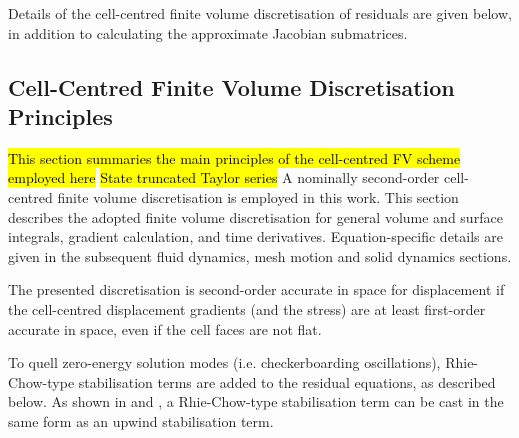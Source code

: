 \documentclass[sn-mathphys,Numbered]{sn-jnl}%
\newcommand{\bb}{\boldsymbol}
\begin{document}
Details of the cell-centred finite volume discretisation of residuals are given below, in addition to calculating the approximate Jacobian submatrices.




\subsection{Cell-Centred Finite Volume Discretisation Principles}
\hl{This section summaries the main principles of the cell-centred FV scheme employed here}
\hl{State truncated Taylor series}
A nominally second-order cell-centred finite volume discretisation is employed in this work.
This section describes the adopted finite volume discretisation for general volume and surface integrals, gradient calculation, and time derivatives.
Equation-specific details are given in the subsequent fluid dynamics, mesh motion and solid dynamics sections.

The presented discretisation is second-order accurate in space for displacement if the cell-centred displacement gradients (and the stress) are at least first-order accurate in space, even if the cell faces are not flat.

To quell zero-energy solution modes (i.e. checkerboarding oscillations), Rhie-Chow-type stabilisation terms \cite{Rhie1983} are added to the residual equations, as described below.
As shown in \citet{Cardiff2025jfnk} and \citet{Cardiff2020}, a Rhie-Chow-type stabilisation term can be cast in the same form as an upwind stabilisation term.

\end{document}
